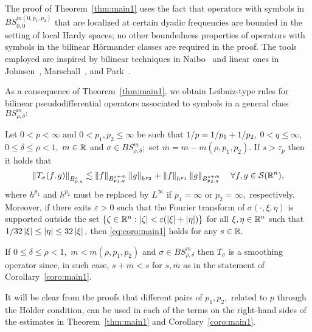 The proof of Theorem~\ref{thm:main1} uses the fact that operators with symbols in $BS^{m(0,p_1,p_2)}_{0,0}$ that are localized at certain dyadic frequencies are bounded in the setting of local Hardy spaces; no other boundedness properties of operators with symbols in the bilinear H\"ormander classes are required in the proof. The tools employed are inspired by bilinear techniques in Naibo~\cite{MR3393696} and linear ones in   Johnsen~\cite{MR2163627}, Marschall~\cite{MR1376592}, and   Park~\cite{Park}.

As a consequence of Theorem~\ref{thm:main1}, we obtain  Leibniz-type rules for bilinear pseudodifferential operators associated to symbols in a general class $BS^m_{\rho,\delta}:$

\begin{corollary}\label{coro:main1} 
Let $0<p<\infty$ and $0<p_1,p_2\le \infty$ be such that $\hcline,$ $0<q\le \infty,$  $0\le\delta \le \rho<1,$   $m\in \re$ and $\sigma\in BS^{m}_{\rho,\delta};$ set $\bar{m}=m-m(\rho,p_1,p_2).$  If  $s>\tau_p$ then it holds that
\begin{equation}\label{eq:coro:main1}
\norm{T_\sigma(f,g)}{\ibes{p}{s}{q}}\lesssim \norm{f}{\ibes{p_1}{s+\bar{m}}{q}}\norm{g}{h^{p_2}} +\norm{f}{h^{p_1}}\norm{g}{\ibes{p_2}{s+\bar{m}}{q}}\quad \forall f,g\in \sw,
\end{equation}
where $h^{p_1}$ and $h^{p_2}$ must be replaced by $L^\infty$ if $p_1=\infty$ or $p_2=\infty,$ respectively. Moreover,  if there exits $\varepsilon>0$ such that the Fourier transform of  $\sigma(\cdot,\xi,\eta)$ is  supported outside the set  $\{\zeta\in\rn:\abs{\zeta}<\varepsilon (\abs{\xi}+\abs{\eta})\}$ for all  $\xi,\eta\in\rn$ such that $1/32\abs{\xi}\le \abs{\eta}\le 32 \abs{\xi},$ then \eqref{eq:coro:main1} holds for any $s\in\re.$
\end{corollary}

\begin{remark} If $0\le \delta\le \rho<1,$ $m<m(\rho,p_1,p_2)$ and $\sigma\in BS^m_{\rho,\delta}$ then $T_\sigma$ is a smoothing operator since, in such case, $s+\bar{m}<s$ for $s,\bar{m}$ as in the statement of Corollary~\ref{coro:main1}. 
\end{remark}

\begin{remark} It will be clear from the proofs that different pairs of $p_1,p_2,$ related to $p$ through the H\"older condition, can be used in each of the terms on the right-hand sides of the estimates in Theorem~\ref{thm:main1} and Corollary~\ref{coro:main1}. 
\end{remark}

